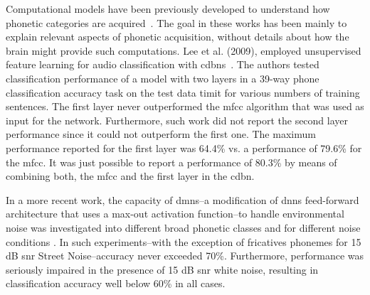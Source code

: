\documentclass[10pt,letterpaper]{article}
\begin{document}


Computational models have been previously developed to understand how phonetic categories are acquired~\cite{rasanen_2012}. The goal in these works has been mainly to explain relevant aspects of phonetic acquisition, without details about how the brain might provide such computations. 
Lee et al. (2009), employed unsupervised feature learning for audio classification with \glspl{cdbn}~\cite{Lee:2009:UFL:2984093.2984217}.
The authors tested classification performance of a model with two layers in a 39-way phone classification accuracy task on the test data \gls{timit} for various numbers of training sentences.
The first layer never outperformed the \gls{mfcc} algorithm that was used as input for the network.
Furthermore, such work did not report the second layer performance since it could not outperform the first one.
The maximum performance reported for the first layer was 64.4\% vs. a performance of 79.6\% for the \gls{mfcc}.
It was just possible to report a performance of 80.3\% by means of combining both, the \gls{mfcc} and the first layer in the \gls{cdbn}.

In a more recent work, the capacity of \glspl{dmn}--a modification of \glspl{dnn} feed-forward architecture that uses a max-out activation function--to handle environmental noise was investigated into different broad phonetic classes and for different noise conditions \cite{silos_2016}.  In such experiments--with the exception of fricatives phonemes for 15 dB \gls{snr} Street Noise--accuracy never exceeded 70\%. Furthermore, performance was seriously impaired in the presence of 15 dB \gls{snr} white noise, resulting in classification accuracy  well below 60\% in all cases.
\end{document}
